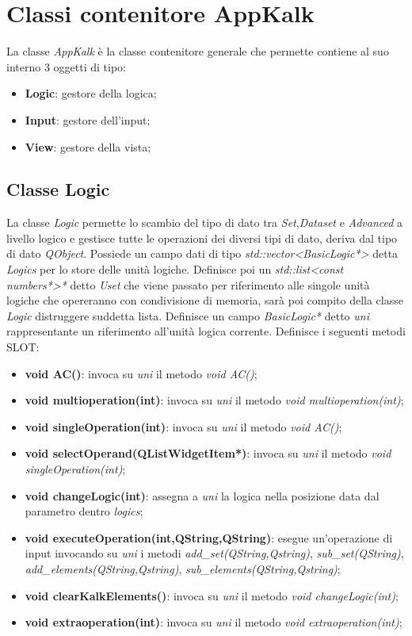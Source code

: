 \documentclass[a4paper,10pt]{article}
\begin{document}
        \section{Classi contenitore AppKalk}
        La classe \textit{AppKalk} è la classe contenitore generale che permette contiene al suo interno 3 oggetti di tipo:
        \begin{itemize}
            \item \textbf{Logic}: gestore della logica;
            \item \textbf{Input}: gestore dell'input;
            \item \textbf{View}: gestore della vista;
        \end{itemize}
        \subsection{Classe Logic}
        La classe \textit{Logic} permette lo scambio del tipo di dato tra \textit{Set},\textit{Dataset} e \textit{Advanced} a livello logico e gestisce tutte le operazioni dei diversi tipi di dato, deriva dal tipo di dato \textit{QObject}.
        Possiede un campo dati di tipo \textit{std::vector<BasicLogic*>} detta \textit{Logics} per lo store delle unità logiche.
        Definisce poi un \textit{std::list<const numbers*>*} detto \textit{Uset} che viene passato per riferimento alle singole unità logiche che opereranno con condivisione di memoria, sarà poi compito della classe \textit{Logic} distruggere suddetta lista.
        Definisce un campo \textit{BasicLogic*} detto \textit{uni} rappresentante un riferimento all'unità logica corrente.
        Definisce i seguenti metodi SLOT:
        \begin{itemize}
            \item \textbf{void AC()}: invoca su \textit{uni} il metodo \textit{void AC()};
            \item \textbf{void multioperation(int)}: invoca su \textit{uni} il metodo \textit{void multioperation(int)};
            \item \textbf{void singleOperation(int)}: invoca su \textit{uni} il metodo \textit{void AC()};
            \item \textbf{void selectOperand(QListWidgetItem*)}: invoca su \textit{uni} il metodo \textit{void singleOperation(int)};
            \item \textbf{void changeLogic(int)}: assegna a \textit{uni} la logica nella posizione data dal parametro dentro \textit{logics};
            \item \textbf{void executeOperation(int,QString,QString)}: esegue un'operazione di input invocando su \textit{uni} i metodi \textit{add\_set(QString,Qstring)}, \textit{sub\_set(QString)}, \textit{add\_elements(QString,Qstring)}, \textit{sub\_elements(QString,Qstring)};
            \item \textbf{void clearKalkElements()}: invoca su \textit{uni} il metodo \textit{void changeLogic(int)};
            \item \textbf{void extraoperation(int)}: invoca su \textit{uni} il metodo \textit{void extraoperation(int)};
        \end{itemize}
\end{document}
